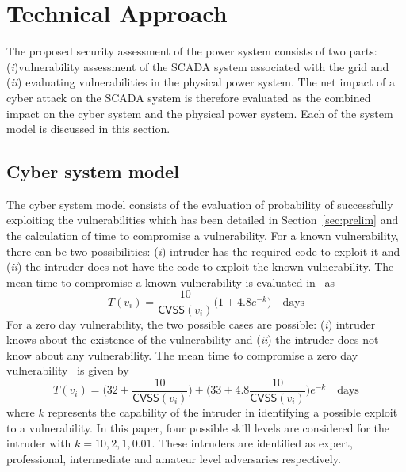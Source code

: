\section{Technical Approach}\label{sec:technical}
The proposed security assessment of the power system consists of two parts: (\textit{i})vulnerability assessment of the SCADA system associated with the grid and (\textit{ii}) evaluating vulnerabilities in the physical power system. The net impact of a cyber attack on the SCADA system is therefore evaluated as the combined impact on the cyber system and the physical power system. Each of the system model is discussed in this section.
\subsection{Cyber system model}\label{sec:cyber}
The cyber system model consists of the evaluation of probability of successfully exploiting the vulnerabilities which has been detailed in Section~\ref{sec:prelim} and the calculation of time to compromise a vulnerability. For a known vulnerability, there can be two possibilities: (\textit{i}) intruder has the required code to exploit it and (\textit{ii}) the intruder does not have the code to exploit the known vulnerability. The mean time to compromise a known vulnerability is evaluated in~\cite{mcqueen} as
\begin{equation}
T(v_i)=\dfrac{10}{\mathsf{CVSS}(v_i)}\bigg(1+4.8e^{-k}\bigg)\quad\textrm{days}
\end{equation}
For a zero day vulnerability, the two possible cases are possible: (\textit{i}) intruder knows about the existence of the vulnerability and (\textit{ii}) the intruder does not know about any vulnerability. The mean time to compromise a zero day vulnerability~\cite{mcqueen} is given by
\begin{equation}
T(v_i)=\bigg(32+\dfrac{10}{\mathsf{CVSS}(v_i)}\bigg)+\bigg(33+4.8\dfrac{10}{\mathsf{CVSS}(v_i)}\bigg)e^{-k}\quad\textrm{days}
\end{equation}
where $k$ represents the capability of the intruder in identifying a possible exploit to a vulnerability. In this paper, four possible skill levels are considered for the intruder with $k=10,2,1,0.01$. These intruders are identified as expert, professional, intermediate and amateur level adversaries respectively.   
 
